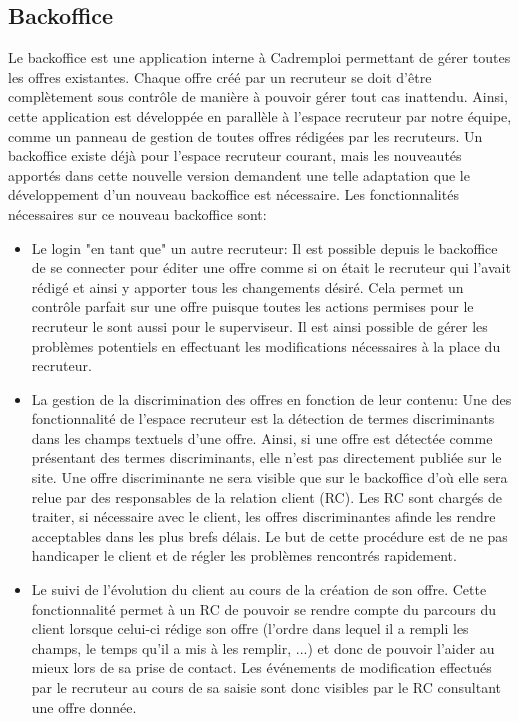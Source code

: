 \subsection{Backoffice}
\label{sub:Backoffice}
Le backoffice est une application interne à Cadremploi permettant de gérer toutes les offres existantes.
Chaque offre créé par un recruteur se doit d'être complètement sous contrôle de manière à pouvoir gérer tout cas inattendu.
Ainsi, cette application est développée en parallèle à l'espace recruteur par notre équipe, comme un panneau de gestion de toutes offres rédigées par les recruteurs.
Un backoffice existe déjà pour l'espace recruteur courant, mais les nouveautés apportés dans cette nouvelle version demandent une telle adaptation que le développement d'un nouveau backoffice est nécessaire.
Les fonctionnalités nécessaires sur ce nouveau backoffice sont:
\begin{itemize}
  \item Le login "en tant que" un autre recruteur:
  Il est possible depuis le backoffice de se connecter pour éditer une offre comme si on était le recruteur qui l'avait rédigé et ainsi y apporter tous les changements désiré.
  Cela permet un contrôle parfait sur une offre puisque toutes les actions permises pour le recruteur le sont aussi pour le superviseur.
  Il est ainsi possible de gérer les problèmes potentiels en effectuant les modifications nécessaires à la place du recruteur.
  \item La gestion de la discrimination des offres en fonction de leur contenu:
  Une des fonctionnalité de l'espace recruteur est la détection de termes discriminants dans les champs textuels d'une offre.
  Ainsi, si une offre est détectée comme présentant des termes discriminants, elle n'est pas directement publiée sur le site.
  Une offre discriminante ne sera visible que sur le backoffice d'où elle sera relue par des responsables de la relation client (RC).
  Les RC sont chargés de traiter, si nécessaire avec le client, les offres discriminantes afinde les rendre acceptables dans les plus brefs délais.
  Le but de cette procédure est de ne pas handicaper le client et de régler les problèmes rencontrés rapidement.
  \item Le suivi de l'évolution du client au cours de la création de son offre.
  Cette fonctionnalité permet à un RC de pouvoir se rendre compte du parcours du client lorsque celui-ci rédige son offre (l'ordre dans lequel il a rempli les champs, le temps qu'il a mis à les remplir, ...) et donc de pouvoir l'aider au mieux lors de sa prise de contact.
  Les événements de modification effectués par le recruteur au cours de sa saisie sont donc visibles par le RC consultant une offre donnée.
\end{itemize}

